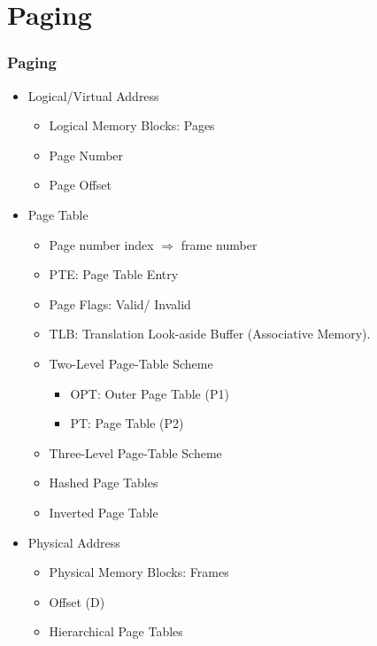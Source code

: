 \documentclass[xcolor=table, notheorems, hyperref={pdfpagelabels=false}]{beamer}
\begin{document}
\section{Paging}
\begin{frame}
\frametitle{Paging}
\begin{itemize}
\item Logical/Virtual Address
\begin{itemize}
\item Logical Memory Blocks: Pages
\item Page Number
\item Page Offset
\end{itemize}
\item Page Table
\begin{itemize}
\item Page number index $\Rightarrow$ frame number
\item PTE: Page Table Entry
\item Page Flags: Valid/ Invalid
\item TLB: Translation Look-aside Buffer (Associative Memory).
\item Two-Level Page-Table Scheme
\begin{itemize}
\item OPT: Outer Page Table (P1)
\item PT: Page Table (P2)
\end{itemize}
\item Three-Level Page-Table Scheme
\item Hashed Page Tables
\item Inverted Page Table
\end{itemize}
\item Physical Address
\begin{itemize}
\item Physical Memory Blocks: Frames
\item Offset (D)
\item Hierarchical Page Tables
\end{itemize}
\end{itemize}
\end{frame}

\end{document}
